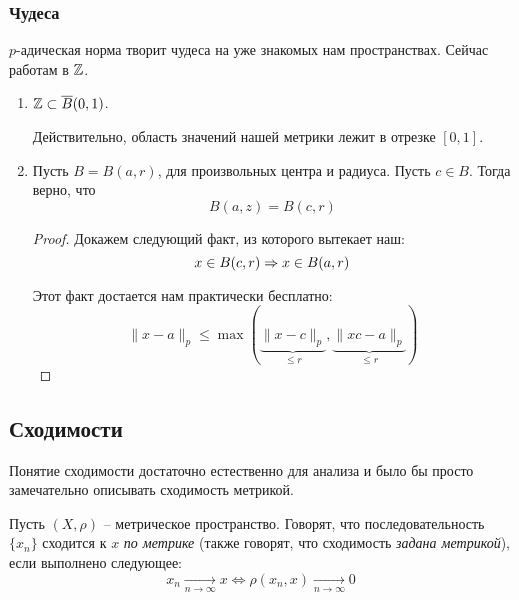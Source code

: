 \documentclass[../functional-analysis_17-18.tex]{subfiles}
\begin{document}
	\subsubsection{Чудеса}
	
	$p$-адическая норма творит чудеса на уже знакомых нам пространствах. Сейчас работам в $\mathbb{Z}$.
	
	\begin{enumerate}
		\item $\mathbb{Z} \subset \overline{B}(0, 1)$.
		
		Действительно, область значений нашей метрики лежит в отрезке $[0, 1]$.
		
		\item Пусть $B = B(a, r)$, для произвольных центра и радиуса. Пусть $c \in B$. Тогда верно, что
		\begin{equation}
			B(a, z) = B(c, r)
		\end{equation}
		\begin{proof}
			Докажем следующий факт, из которого вытекает наш:
			\begin{equation}
				x \in B(c, r) \Rightarrow x \in B(a, r)
			\end{equation}
			
			Этот факт достается нам практически бесплатно:
			\begin{equation}
				\|x - a\|_p \leq \max(\underbrace{\|x - c\|_p}_{\leq r},\underbrace{\|xc - a\|_p}_{\leq r})
			\end{equation}
		\end{proof}
	\end{enumerate}
	
	
	
	\subsection{Сходимости}
	
	Понятие сходимости достаточно естественно для анализа и было бы просто замечательно описывать сходимость метрикой.
	
	\begin{definition}		
		Пусть $(X, \rho)$ -- метрическое пространство. Говорят, что последовательность $\{x_n\}$ сходится к $x$ \textit{по метрике} (также говорят, что сходимость \textit{задана метрикой}), если выполнено следующее:
		\begin{equation}
			x_n \underset{n \to \infty}{\longrightarrow}x \iff \rho(x_n, x) \underset{n \to \infty}{\longrightarrow}0
		\end{equation}
	\end{definition}
	
\end{document}
